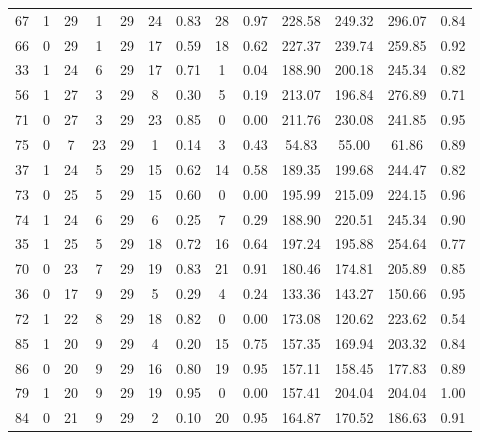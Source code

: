 \documentclass[a4paper,12pt,american]{article}
\theoremstyle{definition}
\begin{document}
\begin{table}[H]
{\begin{tabular}{lcccccccccccc}
67  &     1 &        29 &      1 &    29 &      24 &    0.83 &     28 &   0.97 &  228.58 &  249.32 &  296.07 &  0.84 \\
66  &     0 &        29 &      1 &    29 &      17 &    0.59 &     18 &   0.62 &  227.37 &  239.74 &  259.85 &  0.92 \\
33  &     1 &        24 &      6 &    29 &      17 &    0.71 &      1 &   0.04 &  188.90 &  200.18 &  245.34 &  0.82 \\
56  &     1 &        27 &      3 &    29 &       8 &    0.30 &      5 &   0.19 &  213.07 &  196.84 &  276.89 &  0.71 \\
71  &     0 &        27 &      3 &    29 &      23 &    0.85 &      0 &   0.00 &  211.76 &  230.08 &  241.85 &  0.95 \\
75  &     0 &         7 &     23 &    29 &       1 &    0.14 &      3 &   0.43 &   54.83 &   55.00 &   61.86 &  0.89 \\
37  &     1 &        24 &      5 &    29 &      15 &    0.62 &     14 &   0.58 &  189.35 &  199.68 &  244.47 &  0.82 \\
73  &     0 &        25 &      5 &    29 &      15 &    0.60 &      0 &   0.00 &  195.99 &  215.09 &  224.15 &  0.96 \\
74  &     1 &        24 &      6 &    29 &       6 &    0.25 &      7 &   0.29 &  188.90 &  220.51 &  245.34 &  0.90 \\
35  &     1 &        25 &      5 &    29 &      18 &    0.72 &     16 &   0.64 &  197.24 &  195.88 &  254.64 &  0.77 \\
70  &     0 &        23 &      7 &    29 &      19 &    0.83 &     21 &   0.91 &  180.46 &  174.81 &  205.89 &  0.85 \\
36  &     0 &        17 &      9 &    29 &       5 &    0.29 &      4 &   0.24 &  133.36 &  143.27 &  150.66 &  0.95 \\
72  &     1 &        22 &      8 &    29 &      18 &    0.82 &      0 &   0.00 &  173.08 &  120.62 &  223.62 &  0.54 \\
85  &     1 &        20 &      9 &    29 &       4 &    0.20 &     15 &   0.75 &  157.35 &  169.94 &  203.32 &  0.84 \\
86  &     0 &        20 &      9 &    29 &      16 &    0.80 &     19 &   0.95 &  157.11 &  158.45 &  177.83 &  0.89 \\
79  &     1 &        20 &      9 &    29 &      19 &    0.95 &      0 &   0.00 &  157.41 &  204.04 &  204.04 &  1.00 \\
84  &     0 &        21 &      9 &    29 &       2 &    0.10 &     20 &   0.95 &  164.87 &  170.52 &  186.63 &  0.91 \\

\end{tabular}}
\end{table}
\end{document}
